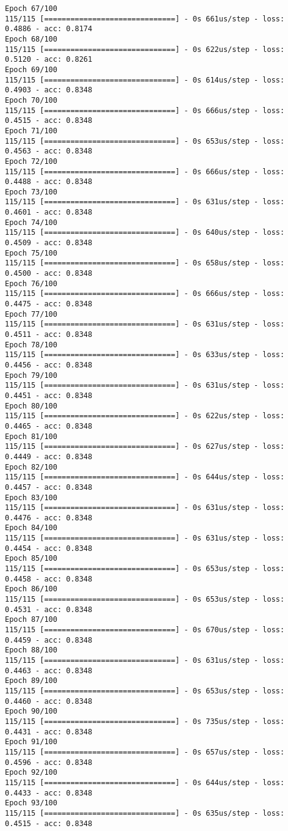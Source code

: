 \documentclass[11pt]{article}
\begin{document}
\begin{Verbatim}[commandchars=\\\{\}]
Epoch 67/100
115/115 [==============================] - 0s 661us/step - loss: 0.4886 - acc: 0.8174
Epoch 68/100
115/115 [==============================] - 0s 622us/step - loss: 0.5120 - acc: 0.8261
Epoch 69/100
115/115 [==============================] - 0s 614us/step - loss: 0.4903 - acc: 0.8348
Epoch 70/100
115/115 [==============================] - 0s 666us/step - loss: 0.4515 - acc: 0.8348
Epoch 71/100
115/115 [==============================] - 0s 653us/step - loss: 0.4563 - acc: 0.8348
Epoch 72/100
115/115 [==============================] - 0s 666us/step - loss: 0.4488 - acc: 0.8348
Epoch 73/100
115/115 [==============================] - 0s 631us/step - loss: 0.4601 - acc: 0.8348
Epoch 74/100
115/115 [==============================] - 0s 640us/step - loss: 0.4509 - acc: 0.8348
Epoch 75/100
115/115 [==============================] - 0s 658us/step - loss: 0.4500 - acc: 0.8348
Epoch 76/100
115/115 [==============================] - 0s 666us/step - loss: 0.4475 - acc: 0.8348
Epoch 77/100
115/115 [==============================] - 0s 631us/step - loss: 0.4511 - acc: 0.8348
Epoch 78/100
115/115 [==============================] - 0s 633us/step - loss: 0.4456 - acc: 0.8348
Epoch 79/100
115/115 [==============================] - 0s 631us/step - loss: 0.4451 - acc: 0.8348
Epoch 80/100
115/115 [==============================] - 0s 622us/step - loss: 0.4465 - acc: 0.8348
Epoch 81/100
115/115 [==============================] - 0s 627us/step - loss: 0.4449 - acc: 0.8348
Epoch 82/100
115/115 [==============================] - 0s 644us/step - loss: 0.4457 - acc: 0.8348
Epoch 83/100
115/115 [==============================] - 0s 631us/step - loss: 0.4476 - acc: 0.8348
Epoch 84/100
115/115 [==============================] - 0s 631us/step - loss: 0.4454 - acc: 0.8348
Epoch 85/100
115/115 [==============================] - 0s 653us/step - loss: 0.4458 - acc: 0.8348
Epoch 86/100
115/115 [==============================] - 0s 653us/step - loss: 0.4531 - acc: 0.8348
Epoch 87/100
115/115 [==============================] - 0s 670us/step - loss: 0.4459 - acc: 0.8348
Epoch 88/100
115/115 [==============================] - 0s 631us/step - loss: 0.4463 - acc: 0.8348
Epoch 89/100
115/115 [==============================] - 0s 653us/step - loss: 0.4460 - acc: 0.8348
Epoch 90/100
115/115 [==============================] - 0s 735us/step - loss: 0.4431 - acc: 0.8348
Epoch 91/100
115/115 [==============================] - 0s 657us/step - loss: 0.4596 - acc: 0.8348
Epoch 92/100
115/115 [==============================] - 0s 644us/step - loss: 0.4433 - acc: 0.8348
Epoch 93/100
115/115 [==============================] - 0s 635us/step - loss: 0.4515 - acc: 0.8348

\end{Verbatim}
\end{document}

